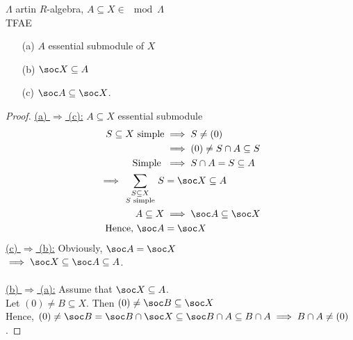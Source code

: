 \begin{lem}
\label{lem:54}
$\Lambda$ artin $R$-algebra, $A \subseteq X \in \mod\Lambda$\\
TFAE
\begin{enumerate}
\item[(a)] $A$ essential submodule of $X$
\item[(b)] $\soc X \subseteq A$
\item[(c)] $\soc A \subseteq \soc X$.
\end{enumerate} 

\begin{proof}
\underline{(a) $\Rightarrow$ (c):} $A \subseteq X$ essential submodule\\
\begin{equation*}
\begin{split}
S \subseteq X \text{ simple} &\implies S \neq (0)\\
&\implies (0) \neq S\cap A \subseteq S\\
\text{Simple } &\implies S \cap A = S \subseteq A\\
\implies \sum_{\begin{smallmatrix} S \subseteq X\\ S \text{ simple} \end{smallmatrix}} S &= \soc X \subseteq A\\
A \subseteq X &\implies \soc A \subseteq \soc X\\
\text{Hence, } \soc A &= \soc X
\end{split}
\end{equation*}
\underline{(c) $\Rightarrow$ (b):} Obviously, $\soc A = \soc X$\\
$\implies \soc X \subseteq \soc A \subseteq A$.\\
\\
\underline{(b) $\Rightarrow$ (a):} Assume that $\soc X \subseteq A$.\\
Let $(0) \neq B \subseteq X$. Then $(0) \neq \soc B \subseteq \soc X$\\
Hence, $(0) \neq \soc B = \soc B \cap \soc X \subseteq \soc B \cap A \subseteq B \cap A \implies B \cap A \neq (0)$.
\end{proof}
\end{lem}


